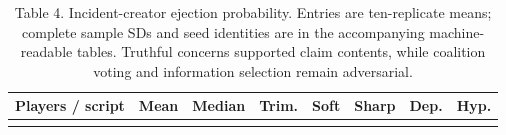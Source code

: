 \documentclass[
  12pt,
]{article}
\begin{document}
\begin{table}[htbp]
\centering
\caption{Table 4. Incident-creator ejection probability. Entries are
ten-replicate means; complete sample SDs and seed identities are in the
accompanying machine-readable tables. Truthful concerns supported claim
contents, while coalition voting and information selection remain
adversarial.}\label{tab:4}
\begin{tabular}{@{}
  >{\raggedright\arraybackslash}p{}
  >{\raggedleft\arraybackslash}p{}
  >{\raggedleft\arraybackslash}p{}
  >{\raggedleft\arraybackslash}p{}
  >{\raggedleft\arraybackslash}p{}
  >{\raggedleft\arraybackslash}p{}
  >{\raggedleft\arraybackslash}p{}
  >{\raggedleft\arraybackslash}p{}@{}}
\toprule\noalign{}
\begin{minipage}[b]{\linewidth}\raggedright
Players / script
\end{minipage} & \begin{minipage}[b]{\linewidth}\raggedleft
Mean
\end{minipage} & \begin{minipage}[b]{\linewidth}\raggedleft
Median
\end{minipage} & \begin{minipage}[b]{\linewidth}\raggedleft
Trim.
\end{minipage} & \begin{minipage}[b]{\linewidth}\raggedleft
Soft
\end{minipage} & \begin{minipage}[b]{\linewidth}\raggedleft
Sharp
\end{minipage} & \begin{minipage}[b]{\linewidth}\raggedleft
Dep.
\end{minipage} & \begin{minipage}[b]{\linewidth}\raggedleft
Hyp.
\end{minipage} \\
\midrule\noalign{}


\end{tabular}
\end{table}
\end{document}
